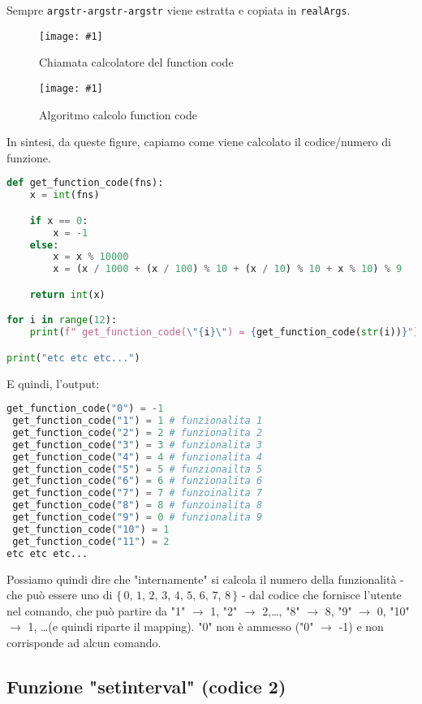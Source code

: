 \documentclass[
    a4paper, %
    11pt %
]{article}
\newcommand{\pic}[4]{\begin{figure}[H]
            \centering
            \texttt{[image: \#1]}
            \caption{#2}
            \label{fig:#1}
            \end{figure}}
\begin{document}
            Sempre \texttt{argstr-argstr-argstr} viene estratta e copiata in \texttt{realArgs}.
            
            \pic{adv_p4}{Chiamata calcolatore del function code}{16cm}{2.5cm}

            \pic{adv_fncode}{Algoritmo calcolo function code}{17cm}{7cm}

            In sintesi, da queste figure, capiamo come viene calcolato il codice/numero di funzione.

            \begin{lstlisting}[language=Python]
def get_function_code(fns):
    x = int(fns)

    if x == 0:
        x = -1
    else:
        x = x % 10000
        x = (x / 1000 + (x / 100) % 10 + (x / 10) % 10 + x % 10) % 9

    return int(x)

for i in range(12):
    print(f" get_function_code(\"{i}\") = {get_function_code(str(i))}")

print("etc etc etc...")
            \end{lstlisting}

            E quindi, l'output:

            \begin{lstlisting}[language=Python]
 get_function_code("0") = -1
 get_function_code("1") = 1 # funzionalita 1
 get_function_code("2") = 2 # funzionalita 2
 get_function_code("3") = 3 # funzionalita 3
 get_function_code("4") = 4 # funzionalita 4
 get_function_code("5") = 5 # funzionailta 5
 get_function_code("6") = 6 # funzionalita 6
 get_function_code("7") = 7 # funzoinalita 7
 get_function_code("8") = 8 # funzoinalita 8
 get_function_code("9") = 0 # funzionalita 9
 get_function_code("10") = 1
 get_function_code("11") = 2
etc etc etc...
            \end{lstlisting}

            Possiamo quindi dire che "internamente" si calcola il numero della funzionalità - che può
            essere uno di $\{\,0,\,1,\,2,\,3,\,4,\,5,\,6,\,7,\,8\,\}$ - dal codice che fornisce l'utente
            nel comando, che può partire da "1" $\rightarrow$ 1, "2" $\rightarrow$ 2,\dots, "8" $\rightarrow$ 8, "9" $\rightarrow$ 0, "10" $\rightarrow$ 1, \dots (e quindi riparte il mapping).
            "0" non è ammesso ("0" $\rightarrow$ -1) e non corrisponde ad alcun comando.

            \subsection{Funzione "setinterval" (codice 2)}
\end{document}
